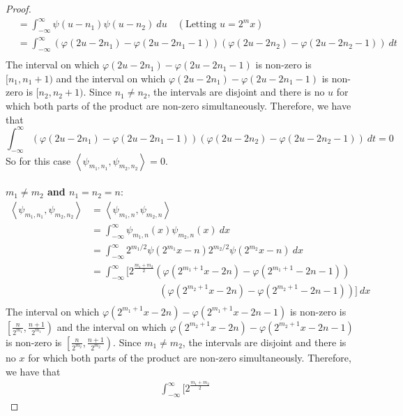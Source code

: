 \documentclass{article}
\newcommand{\parens}[1]{\left(#1\right)}
\newcommand{\abracks}[1]{\left< #1\right>}
\begin{document}
\begin{proof}
\begin{align*}
        &= \int_{-\infty}^\infty \psi(u - n_1)\psi(u - n_2)\ du \quad (\text{Letting }u = 2^mx)\\
        &= \int_{-\infty}^\infty \parens{\varphi(2u-2n_1) - \varphi(2u-2n_1 -1)}
        \parens{\varphi(2u-2n_2) - \varphi(2u-2n_2 -1)}\ dt \\
        \end{align*}
        The interval on which $\varphi(2u-2n_1) - \varphi(2u-2n_1 -1)$ is non-zero is 
        $[n_1, n_1+1)$ and the interval on which $\varphi(2u-2n_1) - \varphi(2u-2n_1 -1)$
        is non-zero is $[n_2, n_2+1)$. Since $n_1\neq n_2$, the intervals are disjoint 
        and there is no $u$ for which both parts of the product are non-zero simultaneously.
        Therefore, we have that 
        $$\int_{-\infty}^\infty \parens{\varphi(2u-2n_1) - \varphi(2u-2n_1 -1)}
        \parens{\varphi(2u-2n_2) - \varphi(2u-2n_2 -1)}\ dt = 0$$
        So for this case $\abracks{\psi_{m_1,n_1}, \psi_{m_2,n_2}} = 0$.\\\\
        \textbf{$m_1 \neq m_2$ and $n_1 = n_2 = n$}:\\
        \begin{align*}
        \abracks{\psi_{m_1,n_1}, \psi_{m_2,n_2}} &= \abracks{\psi_{m_1,n}, \psi_{m_2,n}} \\
        &= \int_{-\infty}^\infty \psi_{m_1, n}(x)\psi_{m_2,n}(x)\ dx \\
        &= \int_{-\infty}^\infty 2^{m_1/2}\psi(2^{m_1}x - n)2^{m_2/2}\psi(2^{m_2}x - n)\ dx \\
        &= \int_{-\infty}^\infty \Bigg[2^{\frac{m_1+m_2}{2}}
        \parens{\varphi(2^{m_1+1}x-2n) - \varphi(2^{m_1+1}-2n -1)}\\
        &\qquad\qquad\qquad\quad \parens{\varphi(2^{m_2+1}x-2n) - \varphi(2^{m_2+1}-2n -1)}
        \Bigg]\ dx \\
        \end{align*}
        The interval on which $\varphi(2^{m_1+1}x-2n) - \varphi(2^{m_1+1}x-2n -1)$ 
        is non-zero is $\left[\frac{n}{2^{m_1}}, \frac{n+1}{2^{m_1}}\right)$ and the 
        interval on which $\varphi(2^{m_2+1}x-2n) - \varphi(2^{m_2+1}x-2n -1)$ is non-zero is 
        $\left[\frac{n}{2^{m_2}}, \frac{n+1}{2^{m_2}}\right)$. Since $m_1\neq m_2$, the
        intervals are disjoint and there is no $x$ for which both parts of the product are 
        non-zero simultaneously. Therefore, we have that 
        \begin{align*}
        &\int_{-\infty}^\infty \Bigg[2^{\frac{m_1+m_2}{2}}

\end{align*}
\end{proof}
\end{document}
